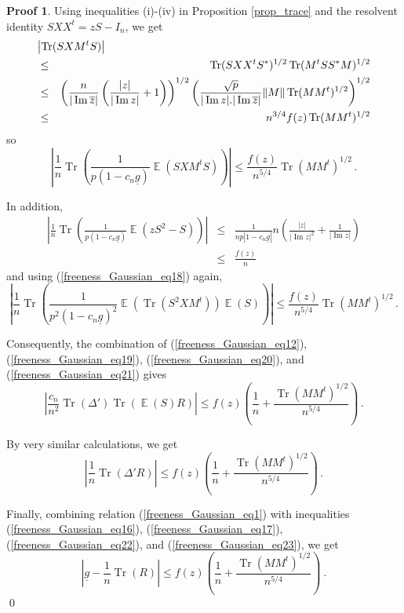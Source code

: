 \documentclass[11pt,a4paper]{article}
\DeclareMathOperator{\E}{\mathbb{E}}
\DeclareMathOperator{\1}{\mathbf{1}}
\DeclareMathOperator{\Imag}{\mathrm{Im}}
\DeclareMathOperator{\Tr}{\mathrm{Tr}}
\newcommand{\gbar}{\underline{g}}
\theoremstyle{definition}
\newtheorem*{Proof}{Proof}
\begin{document}
\begin{Proof}
Using inequalities (i)-(iv) in Proposition \ref{prop_trace} and the resolvent identity $SXX^t = zS - I_n$, we get
\begin{eqnarray} \label{freeness_Gaussian_eq18}
\lefteqn{   \left| \Tr(SXM^tS) \right|   } \nonumber \\
& \le & \Tr(SXX^tS^*)^{1/2} \Tr(M^tSS^*M)^{1/2} \nonumber \\
& \le & \left( \frac{n}{|\Imag \overline{z}|} \left( \frac{|z|}{|\Imag z|} + 1 \right) \right)^{1/2} \left( \frac{\sqrt{p}}{|\Imag z|.|\Imag \overline{z}|} \|M\| \Tr(MM^t)^{1/2} \right)^{1/2} \nonumber \\
& \le & n^{3/4} f(z) \Tr(MM^t)^{1/2}
\end{eqnarray}
so
\begin{equation} \label{freeness_Gaussian_eq19}
\left| \frac1n \Tr \left( \frac{1}{p(1-c_n\gbar)} \E(SXM^tS) \right) \right| \le \frac{f(z)}{n^{5/4}} \Tr(MM^t)^{1/2} \, .
\end{equation}

In addition,
\begin{eqnarray} \label{freeness_Gaussian_eq20}
\left| \frac1n \Tr \left( \frac{1}{p(1-c_n\gbar)} \E(zS^2-S) \right) \right| & \le & \frac{1}{np|1-c_n\gbar|} n \left( \frac{|z|}{|\Imag z|^2} + \frac{1}{|\Imag z|} \right) \nonumber \\
& \le & \frac{f(z)}{n}
\end{eqnarray}
and using (\ref{freeness_Gaussian_eq18}) again,
\begin{equation} \label{freeness_Gaussian_eq21}
\left| \frac1n \Tr \left( \frac{1}{p^2(1-c_n\gbar)^2} \E(\Tr(S^2XM^t)) \E(S) \right) \right| \le \frac{f(z)}{n^{5/4}} \Tr(MM^t)^{1/2} \, .
\end{equation}

Consequently, the combination of (\ref{freeness_Gaussian_eq12}), (\ref{freeness_Gaussian_eq19}), (\ref{freeness_Gaussian_eq20}), and (\ref{freeness_Gaussian_eq21}) gives
\begin{equation} \label{freeness_Gaussian_eq22}
\left| \frac{c_n}{n^2} \Tr(\Delta') \Tr(\E(S)R) \right| \le f(z) \left( \frac1n + \frac{\Tr(MM^t)^{1/2}}{n^{5/4}} \right) \, .
\end{equation}

By very similar calculations, we get
\begin{equation} \label{freeness_Gaussian_eq23}
\left| \frac1n \Tr(\Delta'R) \right| \le f(z) \left( \frac1n + \frac{\Tr(MM^t)^{1/2}}{n^{5/4}} \right) \, .
\end{equation}

Finally, combining relation (\ref{freeness_Gaussian_eq1}) with inequalities (\ref{freeness_Gaussian_eq16}), (\ref{freeness_Gaussian_eq17}), (\ref{freeness_Gaussian_eq22}), and (\ref{freeness_Gaussian_eq23}), we get
\begin{displaymath}
\left| \gbar - \frac1n \Tr(R) \right| \le f(z) \left( \frac1n + \frac{\Tr(MM^t)^{1/2}}{n^{5/4}} \right) \ .
\end{displaymath} \qed
\end{Proof}
\end{document}
